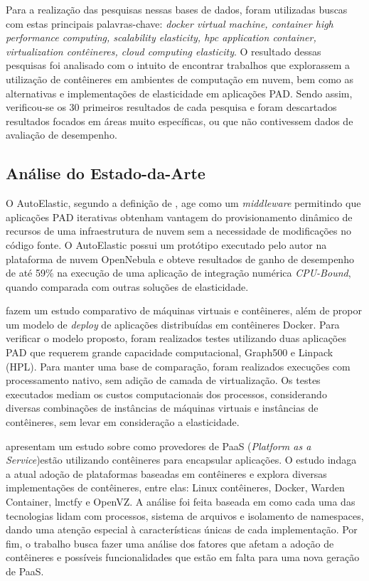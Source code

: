 \documentclass[twoside,english,brazilian]{UNISINOSartigo}
\begin{document}
Para a realização das pesquisas nessas bases de dados, foram utilizadas buscas com estas principais palavras-chave: \textit{docker virtual machine, container high performance computing, scalability elasticity, hpc application container, virtualization contêineres, cloud computing elasticity}. O resultado dessas pesquisas foi analisado com o intuito de encontrar trabalhos que explorassem a utilização de contêineres em ambientes de computação em nuvem, bem como as alternativas e implementações de elasticidade em aplicações PAD. Sendo assim, verificou-se os 30 primeiros resultados de cada pesquisa e foram descartados resultados focados em áreas muito específicas, ou que não contivessem dados de avaliação de desempenho.

\subsection{Análise do Estado-da-Arte}
\label{state}
O AutoElastic, segundo a definição de , age como um \textit{middleware} permitindo que aplicações PAD iterativas obtenham vantagem do provisionamento dinâmico de recursos de uma infraestrutura de nuvem sem a necessidade de modificações no código fonte. O AutoElastic possui um protótipo executado pelo autor na plataforma de nuvem OpenNebula e obteve resultados de ganho de desempenho de até 59\% na execução de uma aplicação de integração numérica \textit{CPU-Bound}, quando comparada com outras soluções de elasticidade. 

 fazem um estudo comparativo de máquinas virtuais e contêineres, além de propor um modelo de \textit{deploy} de aplicações distribuídas em contêineres Docker. Para verificar o modelo proposto, foram realizados testes utilizando duas aplicações PAD que requerem grande capacidade computacional, Graph500 e Linpack (HPL). Para manter uma base de comparação, foram realizados execuções com processamento nativo, sem adição de camada de virtualização. Os testes executados mediam os custos computacionais dos processos, considerando diversas combinações de instâncias de máquinas virtuais e instâncias de contêineres, sem levar em consideração a elasticidade.

 apresentam um estudo sobre como provedores de PaaS (\textit{Platform as a Service})estão utilizando contêineres para encapsular aplicações. O estudo indaga a atual adoção de plataformas baseadas em contêineres e explora diversas implementações de contêineres, entre elas: Linux contêineres, Docker, Warden Container, lmctfy e OpenVZ. A análise foi feita baseada em como cada uma das tecnologias lidam com processos, sistema de arquivos e isolamento de namespaces, dando uma atenção especial à características únicas de cada implementação. Por fim, o trabalho busca fazer uma análise dos fatores que afetam a adoção de contêineres e possíveis funcionalidades que estão em falta para uma nova geração de PaaS.
\end{document}
